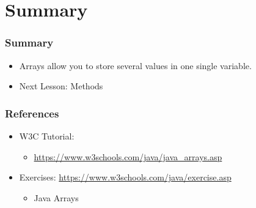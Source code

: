 \documentclass{beamer}
\begin{document}
	\section{Summary}
	
	\begin{frame}
		\frametitle{Summary}
		\begin{itemize}
			\item Arrays allow you to store several values in one single variable.
			\item Next Lesson: Methods
		\end{itemize}
	\end{frame}

	\begin{frame}
		\frametitle{References}
		\begin{itemize}
			\item W3C Tutorial: 
			\begin{itemize}
				\item \url{https://www.w3schools.com/java/java_arrays.asp}
			\end{itemize}
			\item Exercises: \url{https://www.w3schools.com/java/exercise.asp}
			\begin{itemize}
				\item Java Arrays
			\end{itemize}
		\end{itemize}
		
	\end{frame}
\end{document}
